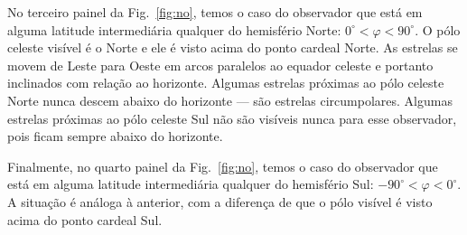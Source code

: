No terceiro painel da Fig.~\ref{fig:no}, temos o caso do observador que está em alguma latitude intermediária qualquer do hemisfério Norte: $0^{\circ} < \varphi < 90^{\circ}$. O pólo celeste visível é o Norte e ele é visto acima do ponto cardeal Norte. As estrelas se movem de Leste para Oeste em arcos paralelos ao equador celeste e portanto inclinados com relação ao horizonte. Algumas estrelas próximas ao pólo celeste Norte nunca descem abaixo do horizonte --- são estrelas circumpolares. Algumas estrelas próximas ao pólo celeste Sul não são visíveis nunca para esse observador, pois ficam sempre abaixo do horizonte.

Finalmente, no quarto painel da Fig.~\ref{fig:no}, temos o caso do observador que está em alguma latitude intermediária qualquer do hemisfério Sul: $-90^{\circ} < \varphi < 0^{\circ}$. A situação é análoga à anterior, com a diferença de que o pólo visível é visto acima do ponto cardeal Sul.


